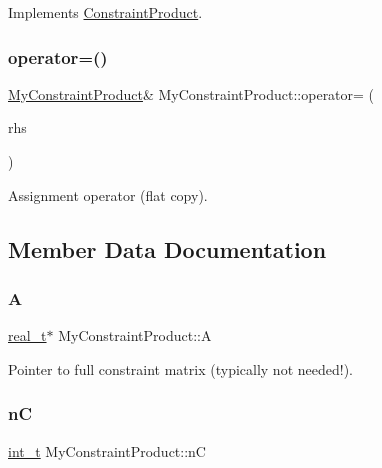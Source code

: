 Implements \hyperlink{class_constraint_product_a597e1001d283a43844b4bb8d45d6b9bd}{Constraint\+Product}.

\mbox{\label{class_my_constraint_product_a782959ec14624f774582d954b8ab9a70}} 
\subsubsection{\texorpdfstring{operator=()}{operator=()}}
{\footnotesize\ttfamily \hyperlink{class_my_constraint_product}{My\+Constraint\+Product}\& My\+Constraint\+Product\+::operator= (\begin{DoxyParamCaption}\item[{const \hyperlink{class_my_constraint_product}{My\+Constraint\+Product} \&}]{rhs }\end{DoxyParamCaption})\hspace{0.3cm}{\ttfamily [inline]}}

Assignment operator (flat copy). 

\subsection{Member Data Documentation}
\mbox{\label{class_my_constraint_product_a654d468b76949a46fc92d3c0fae8b8f7}} 
\subsubsection{\texorpdfstring{A}{A}}
{\footnotesize\ttfamily \hyperlink{qp_o_a_s_e_s__wrapper_8h_a0d00e2b3dfadee81331bbb39068570c4}{real\+\_\+t}$\ast$ My\+Constraint\+Product\+::A\hspace{0.3cm}{\ttfamily [protected]}}

Pointer to full constraint matrix (typically not needed!). \mbox{\label{class_my_constraint_product_aeffd8f3e9124b6d0f0b4e2e9d5487f0a}} 
\subsubsection{\texorpdfstring{nC}{nC}}
{\footnotesize\ttfamily \hyperlink{_types_8hpp_ab6fd6105e64ed14a0c9281326f05e623}{int\+\_\+t} My\+Constraint\+Product\+::nC\hspace{0.3cm}{\ttfamily [protected]}}


